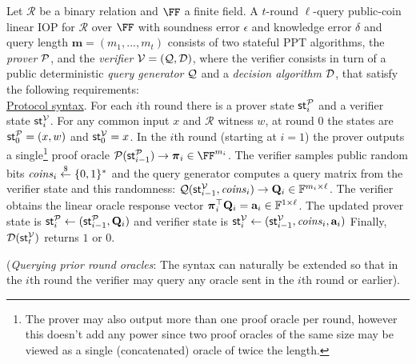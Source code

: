 \begin{definition} 
\label{def:linearIOP}
Let $\mathcal{R}$ be a binary relation and $\FF$ a finite field. A $t$-round $\ell$-query public-coin linear IOP for $\mathcal{R}$ over $\FF$ with soundness error $\epsilon$ and knowledge error $\delta$ and query length $\mathbf{m} = (m_1,...,m_t)$ consists of two stateful PPT algorithms, the \emph{prover} $\mathcal{P}$, and the
\emph{verifier} $\mathcal{V} = (\mathcal{Q}, \mathcal{D})$, where the verifier consists in turn of a public deterministic \emph{query generator} $\mathcal{Q}$ and a
\emph{decision algorithm} $\mathcal{D}$, that satisfy the following requirements:\\
 
\noindent \underline{Protocol syntax}. 
For each $i$th round there is a prover state $\textsf{st}^\mathcal{P}_i$ and a verifier state $\textsf{st}^\mathcal{V}_i$. For any common input $x$ and $\mathcal{R}$ witness $w$, at round 0 the states are $\textsf{st}^\mathcal{P}_0 = (x, w)$ and $\textsf{st}^\mathcal{V}_0 = x$. 
In the $i$th round (starting at $i = 1$) the prover outputs a single\footnote{The prover may also output more than one proof oracle per round, however this doesn't add any power since two proof oracles of the same size may be viewed as a single (concatenated) oracle of twice the length.} proof oracle $\prover(\textsf{st}^\prover_{i-1}) \rightarrow \proofO_i \in \FF^{m_i}$. The verifier samples public random bits $\mathit{coins}_i \overset{\$}{\gets} \{0,1\}^*$ and the query generator computes a query matrix from the verifier state and this randomness: $\mathcal{Q}(\textsf{st}^\mathcal{V}_{i-1}, \mathit{coins}_i) \rightarrow \mathbf{Q}_i \in \mathbb{F}^{m_i \times \ell}$. The verifier obtains the linear oracle response vector $\boldsymbol{\pi}_i^\top \mathbf{Q}_i = \mathbf{a}_i \in \mathbb{F}^{1 \times \ell}$. The updated prover state is $\textsf{st}^\mathcal{P}_i \leftarrow (\textsf{st}^\mathcal{P}_{i-1}, \mathbf{Q}_i)$
and verifier state is $\textsf{st}^\mathcal{V}_i \leftarrow (\textsf{st}^\mathcal{V}_{i-1}, \mathit{coins}_i, \mathbf{a}_i)$
Finally, $\mathcal{D}(\textsf{st}^\mathcal{V}_t)$ returns $1$ or $0$. 

(\emph{Querying prior round oracles}: The syntax can naturally be extended so that in the $i$th round the verifier may query any oracle sent in the $i$th round or earlier). \\ 



\end{definition}
